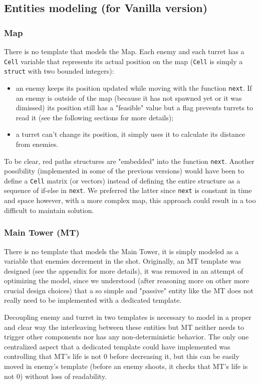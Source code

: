 \documentclass[
10pt, %
a4paper, %
oneside, %
headinclude,footinclude, %
BCOR5mm, %
]{scrartcl}
\begin{document}
		\subsection{Entities modeling (for Vanilla version)}
			\subsubsection{Map}
				There is no template that models the Map. Each enemy and each turret has a \texttt{Cell} variable that represents its actual position on the map (\texttt{Cell} is simply a \texttt{struct} with two bounded integers):
				\begin{itemize}
					\item an enemy keeps its position updated while moving with the function \texttt{next}. If an enemy is outside of the map (because it has not spawned yet or it was dimissed) its position still has a "feasible" value but a flag prevents turrets to read it (see the following sections for more details);
					\item a turret can't change its position, it simply uses it to calculate its distance from enemies.  
				\end{itemize}
				To be clear, red paths structures are "embedded" into the function \texttt{next}. Another possibility (implemented in some of the previous versions) would have been to define a \texttt{Cell} matrix (or vectors) instead of defining the entire structure as a sequence of if-else in \texttt{next}. We preferred the latter since \texttt{next} is constant in time and space however, with a more complex map, this approach could result in a too difficult to maintain solution.
			\subsubsection{Main Tower (MT)}
				There is no template that models the Main Tower, it is simply modeled as a variable that enemies decrement in the shot. Originally, an MT template was designed (see the appendix for more details), it was removed in an attempt of optimizing the model, since we understood (after reasoning more on other more crucial design choices) that a so simple and "passive" entity like the MT does not really need to be implemented with a dedicated template.
				
				Decoupling enemy and turret in two templates is necessary to model in a proper and clear way the interleaving between these entities but MT neither needs to trigger other components nor has any non-deterministic behavior. The only one centralized aspect that a dedicated template could have implemented was controlling that MT's life is not $0$ before decreasing it, but this can be easily moved in enemy's template (before an enemy shoots, it checks that MT's life is not $0$) without loss of readability.
\end{document}
